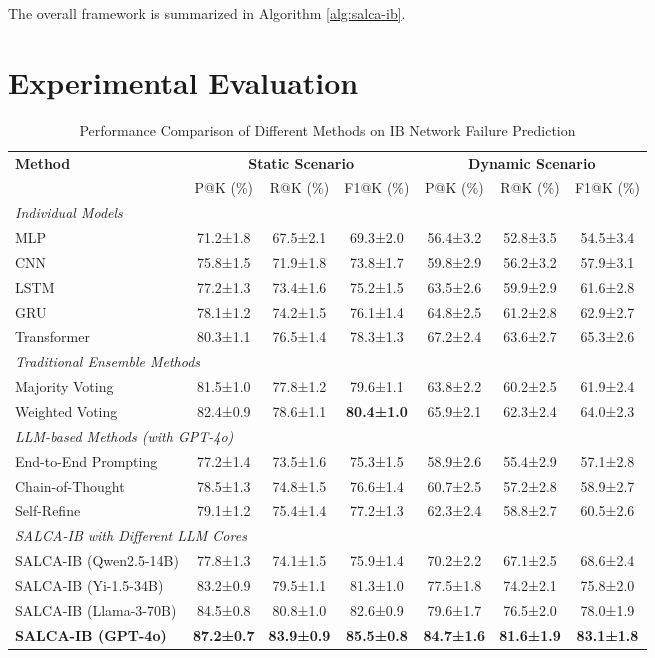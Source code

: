 \documentclass[conference]{IEEEtran}
\begin{document}
The overall framework is summarized in Algorithm \ref{alg:salca-ib}.



\section{Experimental Evaluation}

\begin{table}[!t]
\caption{Performance Comparison of Different Methods on IB Network Failure Prediction}
\label{tab:main_results}
\renewcommand{\arraystretch}{1.2}
\centering
\begin{tabular}{l|ccc|ccc}
\hline\hline
\multirow{2}{*}{\textbf{Method}} & \multicolumn{3}{c|}{\textbf{Static Scenario}} & \multicolumn{3}{c}{\textbf{Dynamic Scenario}} \\
\cline{2-7}
& P@K (\%) & R@K (\%) & F1@K (\%) & P@K (\%) & R@K (\%) & F1@K (\%) \\
\hline
\multicolumn{7}{l}{\textit{Individual Models}} \\
\hline
MLP & 71.2±1.8 & 67.5±2.1 & 69.3±2.0 & 56.4±3.2 & 52.8±3.5 & 54.5±3.4 \\
CNN & 75.8±1.5 & 71.9±1.8 & 73.8±1.7 & 59.8±2.9 & 56.2±3.2 & 57.9±3.1 \\
LSTM & 77.2±1.3 & 73.4±1.6 & 75.2±1.5 & 63.5±2.6 & 59.9±2.9 & 61.6±2.8 \\
GRU & 78.1±1.2 & 74.2±1.5 & 76.1±1.4 & 64.8±2.5 & 61.2±2.8 & 62.9±2.7 \\
Transformer & 80.3±1.1 & 76.5±1.4 & 78.3±1.3 & 67.2±2.4 & 63.6±2.7 & 65.3±2.6 \\
\hline
\multicolumn{7}{l}{\textit{Traditional Ensemble Methods}} \\
\hline
Majority Voting & 81.5±1.0 & 77.8±1.2 & 79.6±1.1 & 63.8±2.2 & 60.2±2.5 & 61.9±2.4 \\
Weighted Voting & 82.4±0.9 & 78.6±1.1 & \textbf{80.4±1.0} & 65.9±2.1 & 62.3±2.4 & 64.0±2.3 \\
\hline
\multicolumn{7}{l}{\textit{LLM-based Methods (with GPT-4o)}} \\
\hline
End-to-End Prompting & 77.2±1.4 & 73.5±1.6 & 75.3±1.5 & 58.9±2.6 & 55.4±2.9 & 57.1±2.8 \\
Chain-of-Thought & 78.5±1.3 & 74.8±1.5 & 76.6±1.4 & 60.7±2.5 & 57.2±2.8 & 58.9±2.7 \\
Self-Refine & 79.1±1.2 & 75.4±1.4 & 77.2±1.3 & 62.3±2.4 & 58.8±2.7 & 60.5±2.6 \\
\hline
\multicolumn{7}{l}{\textit{SALCA-IB with Different LLM Cores}} \\
\hline
SALCA-IB (Qwen2.5-14B) & 77.8±1.3 & 74.1±1.5 & 75.9±1.4 & 70.2±2.2 & 67.1±2.5 & 68.6±2.4 \\
SALCA-IB (Yi-1.5-34B) & 83.2±0.9 & 79.5±1.1 & 81.3±1.0 & 77.5±1.8 & 74.2±2.1 & 75.8±2.0 \\
SALCA-IB (Llama-3-70B) & 84.5±0.8 & 80.8±1.0 & 82.6±0.9 & 79.6±1.7 & 76.5±2.0 & 78.0±1.9 \\
\textbf{SALCA-IB (GPT-4o)} & \textbf{87.2±0.7} & \textbf{83.9±0.9} & \textbf{85.5±0.8} & \textbf{84.7±1.6} & \textbf{81.6±1.9} & \textbf{83.1±1.8} \\


\end{tabular}
\end{table}
\end{document}
